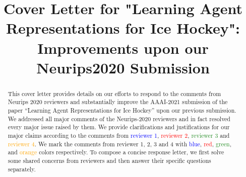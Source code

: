 \documentclass[letterpaper]{article} %
\title{Cover Letter for "Learning Agent Representations for Ice Hockey": Improvements upon our Neurips2020 Submission}
\author{}
\begin{document}
\linenumbers  %
\maketitle

\begin{abstract}
This cover letter provides details on our efforts to respond to the comments from Neurips 2020 reviewers and substantially improve the AAAI-2021 submission of the paper “Learning Agent Representations for Ice Hockey” upon our previous submission. We addressed all major comments of the Neurips-2020 reviewers and in fact resolved every major issue raised by them. We provide clarifications and justifications for our major claims according to the comments from \textcolor{Blue}{reviewer 1}, \textcolor{Red}{reviewer 2}, \textcolor{ForestGreen}{reviewer 3} and \textcolor{orange}{reviewer 4}. We mark the comments from reviewer 1, 2, 3 and 4 with \textcolor{Blue}{blue}, \textcolor{Red}{red}, \textcolor{ForestGreen}{green}, and \textcolor{orange}{orange} colors respectively. To compose a concise response letter, we first solve some shared concerns from reviewers and then answer their specific questions separately. 
\end{abstract}
\end{document}
